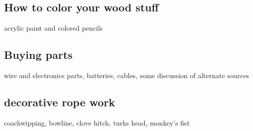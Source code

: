 \subsection{How to color your wood
stuff}\label{how-to-color-your-wood-stuff}

acrylic paint and colored pencils

\subsection{Buying parts}\label{buying-parts}

wire and electronics parts, batteries, cables, some discussion of
alternate sources

\subsection{decorative rope work}\label{decorative-rope-work}

coachwipping, bowline, clove hitch, turks head, monkey's fist
